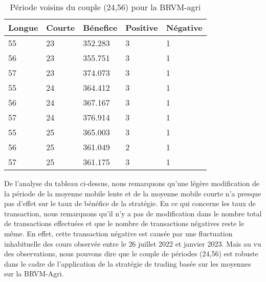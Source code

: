\begin{itemize}
\begin{itemize}
\begin{table}[ht]
    \centering
    \caption{Période voisins du couple (24,56) pour la BRVM-agri}
    \begin{tabular}{p{2cm}p{2cm}p{2cm}p{2cm}p{1.5cm}}
        \hline
        Longue & Courte & Bénefice & Positive &Négative \\ 
        \hline
        55	&23	&352.283	&3	&1	\\ 
        56	&23	&355.751	&3	&1	\\ 
        57	&23	&374.073	&3	&1	\\ 
        55	&24	&364.412	&3	&1	\\ \hline
        \cellcolor{myblue}56	&\cellcolor{myblue}24	&\cellcolor{myblue}367.167	&\cellcolor{myblue}3	&\cellcolor{myblue}1	\\ \hline
        57	&24	&376.914	&3	&1	\\ 
        55	&25	&365.003	&3	&1	\\ 
        56	&25	&361.049	&2	&1	\\ 
        57	&25	&361.175	&3	&1	\\ 
    
            \hline
    \end{tabular}
\end{table}%
\par{De l'analyse du tableau ci-dessus, nous remarquons qu'une légère modification de la période de la moyenne mobile 
lente et de la moyenne mobile courte n'a presque pas d'effet sur le taux de bénéfice de la stratégie.
En ce qui concerne les taux de transaction, nous remarquons qu'il n'y a pas de modification dans le nombre total de transactions 
effectuées et que le nombre de transactions négatives reste le même. En effet, cette transaction négative est causée par une fluctuation inhabituelle des cours observée entre le 
26 juillet 2022 et janvier 2023. Mais au vu des observations, nous pouvons dire que le couple de périodes 
(24,56) est robuste dans le cadre de l'application de la stratégie de trading basée sur les moyennes sur la 
BRVM-Agri.}


\end{itemize}
\end{itemize}

